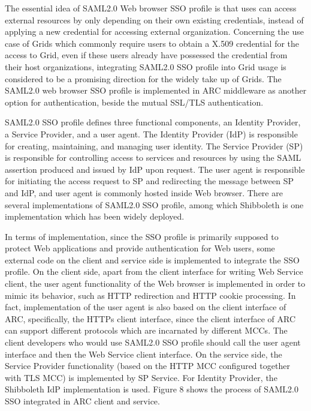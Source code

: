\documentclass{article}                            %
\begin{document}
  The essential idea of SAML2.0 Web browser SSO profile is that uses can access external resources by only depending on their own existing credentials, instead of applying a new credential for accessing external organization. Concerning the use case of Grids which commonly require users to obtain a X.509 credential for the access to Grid, even if these users already have possessed the credential from their host organizations, integrating SAML2.0 SSO profile into Grid usage is considered to be a promising direction for the widely take up of Grids. The SAML2.0 web browser SSO profile is implemented in ARC middleware as another option for authentication, beside the mutual SSL/TLS authentication.

  SAML2.0 SSO profile defines three functional components, an Identity Provider, a Service Provider, and a user agent. The Identity Provider (IdP) is responsible for creating, maintaining, and managing user identity.  The Service Provider (SP) is responsible for controlling access to services and resources by using the SAML assertion produced and issued by IdP upon request. The user agent is responsible for initiating the access request to SP and redirecting the message between SP and IdP, and user agent is commonly hosted inside Web browser. There are several implementations of SAML2.0 SSO profile, among which Shibboleth is one implementation which has been widely deployed.

    In terms of implementation, since the SSO profile is primarily supposed to protect Web applications and provide authentication for Web users, some external code on the client and service side is implemented to integrate the SSO profile. On the client side, apart from the client interface for writing Web Service client, the user agent functionality of the Web browser is implemented in order to mimic its behavior, such as HTTP redirection and HTTP cookie processing. In fact, implementation of the user agent is also based on the client interface of ARC, specifically, the HTTPs client interface, since the client interface of ARC can support different protocols which are incarnated by different MCCs. The client developers who would use SAML2.0 SSO profile should call the user agent interface and then the Web Service client interface. On the service side, the Service Provider functionality (based on the HTTP MCC configured together with TLS MCC) is implemented by SP Service. For Identity Provider, the Shibboleth IdP implementation is used. Figure 8 shows the process of SAML2.0 SSO integrated in ARC client and service.
\end{document}
